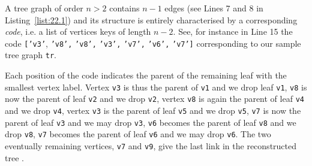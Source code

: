 A tree graph of order $n > 2$ contains $n-1$ edges (see Lines 7 and 8 in Listing~\ref{list:22.1}) and its structure is entirely characterised by a corresponding \Pruefer \emph{code}, i.e. a list of vertices keys of length $n-2$. See, for instance in Line 15 the code \texttt{['v3'}, \texttt{'v8',} \texttt{'v8',} \texttt{'v3',} \texttt{'v7',} \texttt{'v6',} \texttt{'v7']} corresponding to our sample tree graph \texttt{tr}.

Each position of the code indicates the parent of the remaining leaf with the smallest vertex label. Vertex \texttt{v3} is thus the parent of \texttt{v1} and we drop leaf \texttt{v1}, \texttt{v8} is now the parent of leaf \texttt{v2} and we drop \texttt{v2}, vertex \texttt{v8} is again the parent of leaf \texttt{v4} and we drop \texttt{v4}, vertex \texttt{v3} is the parent of leaf \texttt{v5} and we drop \texttt{v5}, \texttt{v7} is now the parent of leaf \texttt{v3} and we may drop \texttt{v3}, \texttt{v6} becomes the parent of leaf \texttt{v8} and we drop \texttt{v8}, \texttt{v7} becomes the parent of leaf \texttt{v6} and we may drop \texttt{v6}. The two eventually remaining vertices, \texttt{v7} and \texttt{v9}, give the last link in the reconstructed tree \citep{JPB-1991}.  

